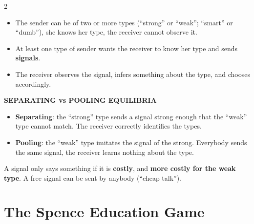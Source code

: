 \documentclass[a4paper,9pt]{extarticle}
\begin{document}
\begin{multicols}{2}
\begin{definition}
\begin{itemize}

\item The sender can be of two or more types (``strong'' or ``weak''; ``smart'' or ``dumb''),
she knows her type, the receiver cannot observe it.

\item At least one type of sender wants the receiver to know her type and sends
\textbf{signals}.

\item The receiver observes the signal, infers something about the type, and chooses
accordingly.

\end{itemize}

\end{definition}


\begin{definition}

\textbf{SEPARATING vs POOLING EQUILIBRIA}

\begin{itemize}

\item \textbf{Separating}: the ``strong'' type sends a signal strong enough that the ``weak''
type cannot match. The receiver correctly identifies the types.

\item \textbf{Pooling}: the ``weak'' type imitates the signal of the strong. Everybody sends
the same signal, the receiver learns nothing about the type.

\end{itemize}

\end{definition}


\begin{important}

A signal only says something if it is \textbf{costly}, and \textbf{more costly for the weak
type}. A free signal can be sent by anybody (``cheap talk'').

\end{important}



\section{The Spence Education Game}


\begin{itemize}


\end{itemize}
\end{multicols}
\end{document}
